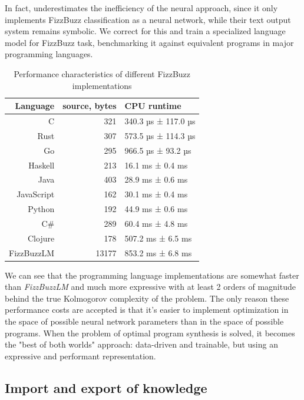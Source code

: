 In fact, \cite{grusFizzBuzzTensorflow} underestimates the inefficiency of the neural approach, since it only implements FizzBuzz \cite{reesFizzBuzz1012002} classification as a neural network, while their text output system remains symbolic.
We correct for this and train a specialized language model for FizzBuzz task, benchmarking it against equivalent programs in major programming languages.

\begin{table}[H]
    \centering
    \begin{tabular}{r|r|l}
         Language & source, bytes & CPU runtime \\
         \midrule
         C & 321 & 340.3 µs ± 117.0 µs \\
         Rust & 307 & 573.5 µs ± 114.3 µs \\
         Go & 295 & 966.5 µs ±  93.2 µs \\
         Haskell & 213 & 16.1 ms ± 0.4 ms \\
         Java & 403 & 28.9 ms ± 0.6 ms \\
         JavaScript & 162 & 30.1 ms ± 0.4 ms \\
         Python & 192 & 44.9 ms ± 0.6 ms \\
         C\# & 289 & 60.4 ms ± 4.8 ms \\
         Clojure & 178 & 507.2 ms ± 6.5 ms \\
         FizzBuzzLM & 13177 & 853.2 ms ± 6.8 ms
    \end{tabular}
    \caption{Performance characteristics of different FizzBuzz implementations}
    \label{tab:my_label}
\end{table}

We can see that the programming language implementations are somewhat faster than \emph{FizzBuzzLM} and much more expressive with at least 2 orders of magnitude behind the true Kolmogorov complexity \cite{kolmogorovThreeApproachesQuantitative1965} of the problem.
The only reason these performance costs are accepted is that it's easier to implement optimization in the space of possible neural network parameters than in the space of possible programs. 
When the problem of optimal program synthesis is solved, it becomes the "best of both worlds" approach: data-driven and trainable, but using an expressive and performant representation.
 
\subsection{Import and export of knowledge}
\label{sec:importexport}

